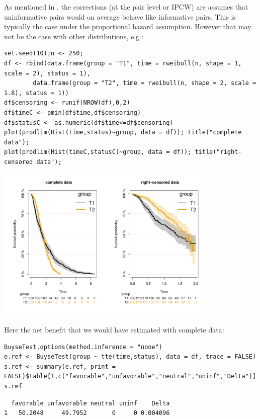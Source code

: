 \documentclass[12pt]{article}
\begin{document}
As mentioned in \cite{peron2021correcting}, the corrections (at the pair
level or IPCW) are assumes that uninformative pairs would on average
behave like informative pairs. This is typically the case under the
proportional hazard assumption. However that may not be the case with
other distributions, e.g.:
\lstset{language=r,label= ,caption= ,captionpos=b,numbers=none}
\begin{lstlisting}
set.seed(10);n <- 250; 
df <- rbind(data.frame(group = "T1", time = rweibull(n, shape = 1, scale = 2), status = 1),
	    data.frame(group = "T2", time = rweibull(n, shape = 2, scale = 1.8), status = 1))
df$censoring <- runif(NROW(df),0,2)
df$timeC <- pmin(df$time,df$censoring)
df$statusC <- as.numeric(df$time<=df$censoring)
plot(prodlim(Hist(time,status)~group, data = df)); title("complete data");
plot(prodlim(Hist(timeC,statusC)~group, data = df)); title("right-censored data");
\end{lstlisting}
\begin{center}
\includegraphics[width=0.8\textwidth]{./figures/plot-crossingSurv.pdf}
\end{center}

Here the net benefit that we would have estimated with complete data:
\lstset{language=r,label= ,caption= ,captionpos=b,numbers=none}
\begin{lstlisting}
BuyseTest.options(method.inference = "none")
e.ref <- BuyseTest(group ~ tte(time,status), data = df, trace = FALSE)
s.ref <- summary(e.ref, print = FALSE)$table[1,c("favorable","unfavorable","neutral","uninf","Delta")]
s.ref
\end{lstlisting}

\begin{verbatim}
  favorable unfavorable neutral uninf    Delta
1   50.2048     49.7952       0     0 0.004096
\end{verbatim}
\end{document}
